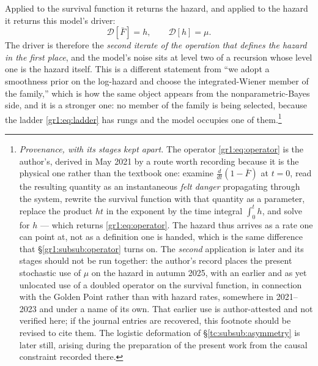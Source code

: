 \documentclass[11pt]{article}
\numberwithin{equation}{section}
\theoremstyle{plain}
\theoremstyle{definition}
\theoremstyle{remark}
\begin{document}
\noindent Applied to the survival function it returns the hazard, and
applied to the hazard it returns this model's driver:
\begin{equation}\label{gr1:eq:ladder}
\mathcal D[\bar F]=h,\qquad \mathcal D[h]=\mu .
\end{equation}
The driver is therefore the \emph{second iterate of the operation that
defines the hazard in the first place}, and the model's noise sits at
level two of a recursion whose level one is the hazard itself. This is a
different statement from ``we adopt a smoothness prior on the log-hazard
and choose the integrated-Wiener member of the family,'' which is how
the same object appears from the nonparametric-Bayes side, and it is a
stronger one: no member of the family is being selected, because the
ladder \eqref{gr1:eq:ladder} has rungs and the model occupies one of
them.\footnote{%
\emph{Provenance, with its stages kept apart.} The operator
\eqref{gr1:eq:operator} is the author's, derived in May 2021 by a route
worth recording because it is the physical one rather than the textbook
one: examine $\frac{d}{dt}(1-\bar F)$ at $t=0$, read the resulting
quantity as an instantaneous \emph{felt danger} propagating through the
system, rewrite the survival function with that quantity as a parameter,
replace the product $ht$ in the exponent by the time integral
$\int_0^t h$, and solve for $h$ --- which returns
\eqref{gr1:eq:operator}. The hazard thus arrives as a rate one can point
at, not as a definition one is handed, which is the same difference that
\S\ref{gr1:subsub:operator} turns on. The \emph{second} application is
later and its stages should not be run together: the author's record
places the present stochastic use of $\mu$ on the hazard in autumn 2025,
with an earlier and as yet unlocated use of a doubled operator on the
survival function, in connection with the Golden Point rather than with
hazard rates, somewhere in 2021--2023 and under a name of its own. That
earlier use is author-attested and not verified here; if the journal
entries are recovered, this footnote should be revised to cite them.
The logistic deformation of \S\ref{tc:subsub:asymmetry} is later still,
arising during the preparation of the present work from the causal
constraint recorded there.}
\end{document}
